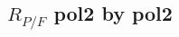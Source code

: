 \documentclass[10pt,oneside]{article}
\begin{document}

\subsection{\texorpdfstring{$R_{P/F}$}{Rpf} pol2 by pol2}
\end{document}
